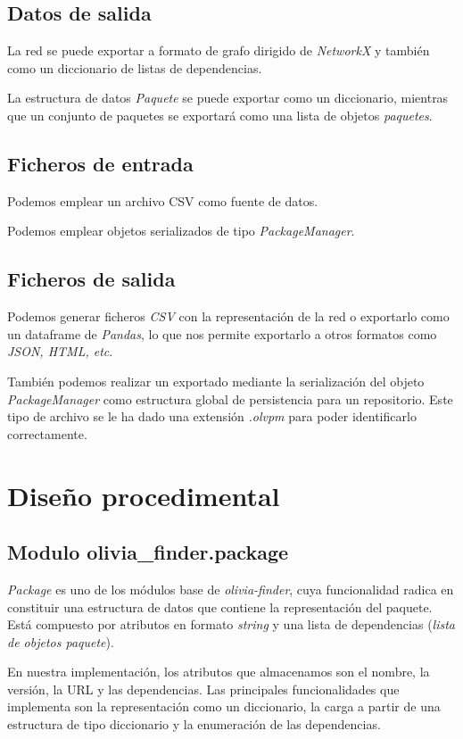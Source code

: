 \subsection{Datos de salida}
La red se puede exportar a formato de grafo dirigido de \textit{NetworkX} y también como 
un diccionario de listas de dependencias.

La estructura de datos \textit{Paquete} se puede exportar como un diccionario, mientras 
que un conjunto de paquetes se exportará como una lista de objetos \textit{paquetes}.

\subsection{Ficheros de entrada}
Podemos emplear un archivo CSV como fuente de datos.

Podemos emplear objetos serializados de tipo \textit{PackageManager}.

\subsection{Ficheros de salida}
Podemos generar ficheros \textit{CSV} con la representación de la red o exportarlo como un dataframe de \textit{Pandas},
lo que nos permite exportarlo a otros formatos como \textit{JSON, HTML, etc}.

También podemos realizar un exportado mediante la serialización del objeto \textit{PackageManager} 
como estructura global de persistencia para un repositorio. Este tipo de archivo se le ha dado una 
extensión \textit{.olvpm} para poder identificarlo correctamente.

\section{Diseño procedimental}

\subsection{Modulo olivia\_finder.package}

\textit{Package} es uno de los módulos base de \textit{olivia-finder}, cuya funcionalidad radica en 
constituir una estructura de datos que contiene la representación del paquete. Está compuesto por 
atributos en formato \textit{string} y una lista de dependencias (\textit{lista de objetos paquete}).

En nuestra implementación, los atributos que almacenamos son el nombre, la versión, la URL y las 
dependencias. Las principales funcionalidades que implementa son la representación como un 
diccionario, la carga a partir de una estructura de tipo diccionario y la enumeración de las 
dependencias.


